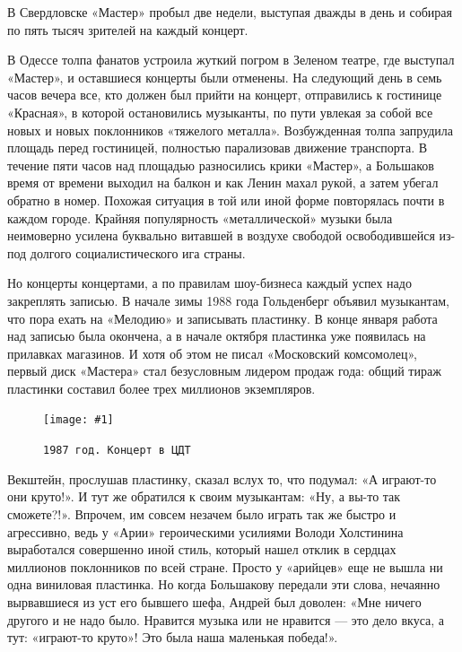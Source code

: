 \documentclass[16pt,a5paper]{book}
\newcommand{\myincludegraphics}[1]{\texttt{[image: \#1]}}
\begin{document}
В Свердловске «Мастер» пробыл две недели, выступая дважды в день и собирая по пять тысяч зрителей на каждый концерт.

В Одессе толпа фанатов устроила жуткий погром в Зеленом театре, где выступал «Мастер», и оставшиеся концерты были
отменены. На следующий день в семь часов вечера все, кто должен был прийти на концерт, отправились к гостинице
«Красная», в которой остановились музыканты, по пути увлекая за собой все новых и новых поклонников «тяжелого металла».
Возбужденная толпа запрудила площадь перед гостиницей, полностью парализовав движение транспорта. В течение пяти часов
над площадью разносились крики «Мастер», а Большаков время от времени выходил на балкон и как Ленин махал рукой, а затем
убегал обратно в номер. Похожая ситуация в той или иной форме повторялась почти в каждом городе. Крайняя популярность
«металлической» музыки была неимоверно усилена буквально витавшей в воздухе свободой освободившейся из-под долгого
социалистического ига страны.

Но концерты концертами, а по правилам шоу-бизнеса каждый успех надо закреплять записью. В начале зимы 1988 года
Гольденберг объявил музыкантам, что пора ехать на «Мелодию» и записывать пластинку. В конце января работа над записью
была окончена, а в начале октября пластинка уже появилась на прилавках магазинов. И хотя об этом не писал «Московский
комсомолец», первый диск «Мастера» стал безусловным лидером продаж года: общий тираж пластинки составил более трех
миллионов экземпляров.

\begin{figure}[h]
    \centering
    \myincludegraphics{Image21}
    \caption{\texttt{1987 год. Концерт в ЦДТ}}
\end{figure}

Векштейн, прослушав пластинку, сказал вслух то, что подумал: «А играют-то они круто!». И тут же обратился к своим
музыкантам: «Ну, а вы-то так сможете?!». Впрочем, им совсем незачем было играть так же быстро и агрессивно, ведь у
«Арии» героическими усилиями Володи Холстинина выработался совершенно иной стиль, который нашел отклик в сердцах
миллионов поклонников по всей стране. Просто у «арийцев» еще не вышла ни одна виниловая пластинка. Но когда Большакову
передали эти слова, нечаянно вырвавшиеся из уст его бывшего шефа, Андрей был доволен: «Мне ничего другого и не надо
было. Нравится музыка или не нравится — это дело вкуса, а тут: «играют-то круто»! Это была наша маленькая победа!».
\end{document}
